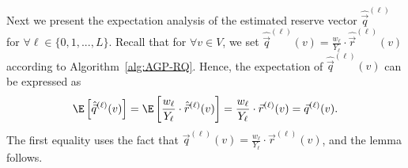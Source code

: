 Next we present the expectation analysis of the estimated reserve vector $\hat{\vec{q}}^{(\ell)}$ for $\forall \ell\in \{0,1,...,L\}$. Recall that for $\forall v \in V$, we set $\hat{\vec{q}}^{(\ell)}(v)=\frac{w_{\ell}}{Y_{\ell}}\cdot \hat{\vec{r}}^{(\ell)}(v)$ according to Algorithm~\ref{alg:AGP-RQ}. Hence, the expectation of $\hat{\vec{q}}^{(\ell)}(v)$ can be expressed as
\begin{equation}\nonumber%
\begin{aligned}
\E \left[ \hat{\vec{q}}^{(\ell)}(v) \right]=\E \left[\frac{w_{\ell}}{Y_{\ell}}\cdot \hat{\vec{r}}^{(\ell)}(v) \right]=\frac{w_{\ell}}{Y_{\ell}}\cdot \vec{r}^{(\ell)}(v)=\vec{q}^{(\ell)}(v). 
\end{aligned}
\end{equation} 
The first equality uses the fact that $\vec{q}^{(\ell)}(v)=\frac{w_{\ell}}{Y_{\ell}} \cdot \vec{r}^{(\ell)}(v)$, and the lemma follows. 




